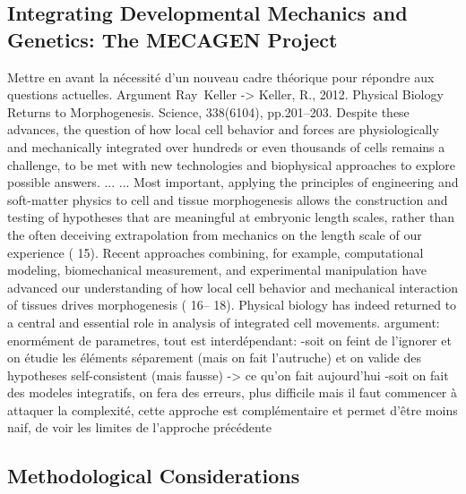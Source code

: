 \subsection{Integrating Developmental Mechanics and Genetics: The MECAGEN Project}
  Mettre en avant la nécessité d'un nouveau cadre théorique pour répondre aux questions actuelles.  Argument Ray Keller -> Keller, R., 2012. Physical Biology Returns to Morphogenesis. Science, 338(6104), pp.201–203.  Despite these advances, the question of how local cell behavior and forces are physiologically and mechanically integrated over hundreds or even thousands of cells remains a challenge, to be met with new technologies and biophysical approaches to explore possible answers. ... ... Most important, applying the principles of engineering and soft-matter physics to cell and tissue morphogenesis allows the construction and testing of hypotheses that are meaningful at embryonic length scales, rather than the often deceiving extrapolation from mechanics on the length scale of our experience ( 15). Recent approaches combining, for example, computational modeling, biomechanical measurement, and experimental manipulation have advanced our understanding of how local cell behavior and mechanical interaction of tissues drives morphogenesis ( 16– 18). Physical biology has indeed returned to a central and essential role in analysis of integrated cell movements.  argument:  enormément de parametres, tout est interdépendant: -soit on feint de l'ignorer et on étudie les éléments séparement (mais on fait l'autruche) et on valide des hypotheses self-consistent (mais fausse) -> ce qu'on fait aujourd'hui  -soit on fait des modeles integratifs, on fera des erreurs, plus difficile mais il faut commencer à attaquer la complexité, cette approche est complémentaire et permet d'être moins naif, de voir les limites de l'approche précédente  


\subsection{Methodological Considerations}


